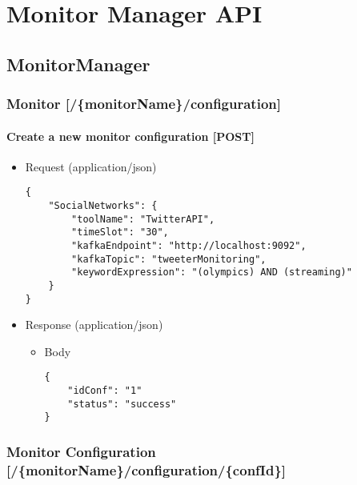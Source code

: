 
\chapter{Monitor Manager API} %

\label{MonitorManager} %

\section{MonitorManager}\label{monitormanager}

\subsection{Monitor
{[}/\{monitorName\}/configuration{]}}\label{monitor-monitornameconfiguration}

\subsubsection{Create a new monitor configuration
{[}POST{]}}\label{create-a-new-monitor-configuration-post}

\begin{itemize}
\item
  Request (application/json)

\begin{verbatim}
{
    "SocialNetworks": {
        "toolName": "TwitterAPI",
        "timeSlot": "30",
        "kafkaEndpoint": "http://localhost:9092",
        "kafkaTopic": "tweeterMonitoring",
        "keywordExpression": "(olympics) AND (streaming)"
    }
}
\end{verbatim}
\item
  Response (application/json)

  \begin{itemize}
  \item
    Body

\begin{verbatim}
{
    "idConf": "1"
    "status": "success"
}
\end{verbatim}
  \end{itemize}
\end{itemize}

\subsection{Monitor Configuration
{[}/\{monitorName\}/configuration/\{confId\}{]}}\label{monitor-configuration-monitornameconfigurationconfid}

